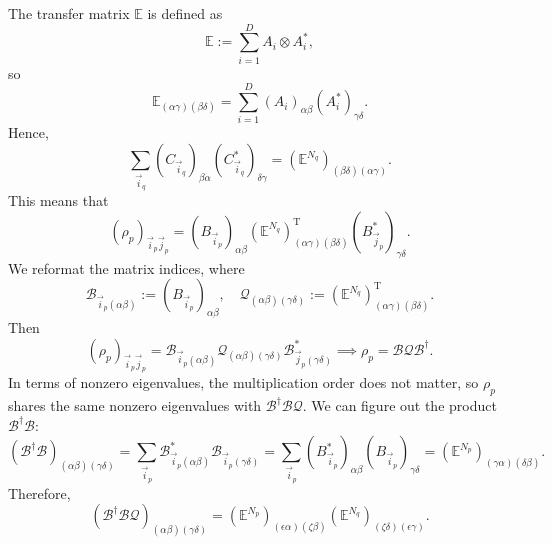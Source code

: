 \documentclass[11pt]{article}
\begin{document}
	The transfer matrix $\mathbb{E}$ is defined as
	\[\mathbb{E}:=\sum_{i=1}^{D}A_{i}\otimes A_{i}^{\ast},\]
	so
	\[\mathbb{E}_{(\alpha\gamma)(\beta\delta)}=\sum_{i=1}^{D}(A_{i})_{\alpha\beta}(A_{i}^{\ast})_{\gamma\delta}.\]
	Hence,
	\[\sum_{\vec{i}_{q}}(C_{\vec{i}_{q}})_{\beta\alpha}(C_{\vec{i}_{q}}^{\ast})_{\delta\gamma}=(\mathbb{E}^{N_{q}})_{(\beta\delta)(\alpha\gamma)}.\]
	This means that
	\[(\rho_{p})_{\vec{i}_{p}\vec{j}_{p}}=(B_{\vec{i}_{p}})_{\alpha\beta}(\mathbb{E}^{N_{q}})^{\mathrm{T}}_{(\alpha\gamma)(\beta\delta)}(B_{\vec{j}_{p}}^{\ast})_{\gamma\delta}.\]
	We reformat the matrix indices, where
	\[\mathscr{B}_{\vec{i}_{p}(\alpha\beta)}:=(B_{\vec{i}_{p}})_{\alpha\beta},\quad\mathscr{Q}_{(\alpha\beta)(\gamma\delta)}:=(\mathbb{E}^{N_{q}})^{\mathrm{T}}_{(\alpha\gamma)(\beta\delta)}.\]
	Then
	\[(\rho_{p})_{\vec{i}_{p}\vec{j}_{p}}=\mathscr{B}_{\vec{i}_{p}(\alpha\beta)}\mathscr{Q}_{(\alpha\beta)(\gamma\delta)}\mathscr{B}^{\ast}_{\vec{j}_{p}(\gamma\delta)}\implies\rho_{p}=\mathscr{B}\mathscr{Q}\mathscr{B}^{\dagger}.\]
	In terms of nonzero eigenvalues, the multiplication order does not matter, so $\rho_{p}$ shares the same nonzero eigenvalues with $\mathscr{B}^{\dagger}\mathscr{B}\mathscr{Q}$.
	We can figure out the product $\mathscr{B}^{\dagger}\mathscr{B}$:
	\[(\mathscr{B}^{\dagger}\mathscr{B})_{(\alpha\beta)(\gamma\delta)}=\sum_{\vec{i}_{p}}\mathscr{B}^{\ast}_{\vec{i}_{p}(\alpha\beta)}\mathscr{B}_{\vec{i}_{p}(\gamma\delta)}=\sum_{\vec{i}_{p}}(B_{\vec{i}_{p}}^{\ast})_{\alpha\beta}(B_{\vec{i}_{p}})_{\gamma\delta}=(\mathbb{E}^{N_{p}})_{(\gamma\alpha)(\delta\beta)}.\]
	Therefore,
	\[(\mathscr{B}^{\dagger}\mathscr{B}\mathscr{Q})_{(\alpha\beta)(\gamma\delta)}=(\mathbb{E}^{N_{p}})_{(\epsilon\alpha)(\zeta\beta)}(\mathbb{E}^{N_{q}})_{(\zeta\delta)(\epsilon\gamma)}.\]
	
\end{document}
